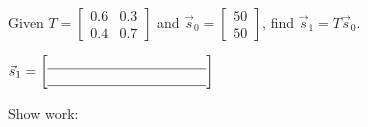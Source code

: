 \documentclass[10pt]{article}
\begin{document}
\vspace{0.06in}

\begin{practicebox}
Given $T = \begin{bmatrix}0.6&0.3\\0.4&0.7\end{bmatrix}$ and
$\vec{s}_0 = \begin{bmatrix}50\\50\end{bmatrix}$,
find $\vec{s}_1 = T\vec{s}_0$.

\vspace{8pt}
$\vec{s}_1 = \begin{bmatrix}\blank{4cm} \\ \blank{4cm}\end{bmatrix}$

\vspace{6pt}
Show work: \writeline
\end{practicebox}
\end{document}
